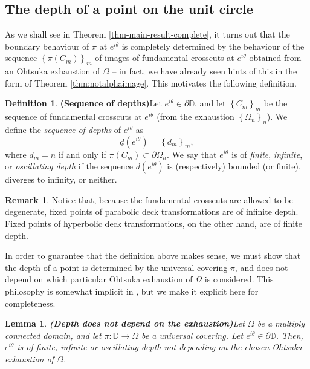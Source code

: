 \documentclass[11pt,a4paper,reqno]{amsart}
\theoremstyle{plain}
\newtheorem{lemma}[thm]{Lemma}
\theoremstyle{definition}
\newtheorem{defi}[thm]{Definition}
\newtheorem{obs}[thm]{Remark}
\theoremstyle{plain}
\begin{document}
\subsection{The depth of a point on the unit circle}\label{ssec:depth} As we shall see in Theorem \ref{thm-main-result-complete},
it turns out that the boundary behaviour of $\pi$ at $e^{i\theta}$ is completely determined by the behaviour of the sequence $\left\lbrace \pi(C_m)\right\rbrace _m$ of images of fundamental crosscuts at $e^{i\theta}$ obtained from an Ohtsuka exhaustion of $\Omega$ -- in fact, we have already seen hints of this in the form of Theorem \ref{thm:notalphaimage}. This motivates the following definition.
\begin{defi}{\bf (Sequence of depths)}\label{def:depthalpha}
	Let $ e^{i\theta}\in\partial\mathbb{D} $, and let $ \left\lbrace C_m\right\rbrace _m $ be the sequence of fundamental crosscuts at $ e^{i\theta} $ (from the exhaustion $ \left\lbrace \Omega_n\right\rbrace _n $). We define the {\em sequence of depths} of $ e^{i\theta} $ as \[\underline{d}(e^{i\theta}) = \left\lbrace d_m\right\rbrace _m,\] where $ d_m=n $ if and only if $ \pi (C_m)\subset \partial\Omega_n $.
	We say that $ e^{i\theta} $ is of {\em finite}, {\em infinite}, or {\em oscillating depth} if the sequence $ \underline{d}(e^{i\theta}) $ is (respectively) bounded (or finite), diverges to infinity, or neither.
\end{defi}
\begin{obs}
	Notice that, because the fundamental crosscuts are allowed to be degenerate, fixed points of parabolic deck transformations are of infinite depth. Fixed points of hyperbolic deck transformations, on the other hand, are of finite depth.
\end{obs}
In order to guarantee that the definition above makes sense, we must show that the depth of a point is determined by the universal covering $\pi$, and does not depend on which particular Ohtsuka exhaustion of $\Omega$ is considered. This philosophy is somewhat implicit in \cite{Oht54}, but we make it explicit here for completeness.
\begin{lemma}{\bf (Depth does not depend on the exhaustion)}\label{lemma-equivalence-ohtsuka}
	Let $ \Omega $ be a multiply connected domain, and let $ \pi\colon \mathbb{D}\to\Omega $ be a universal covering. Let $ e^{i\theta} \in\partial\mathbb{D}$. Then, $ e^{i\theta} $ is of finite, infinite or oscillating depth  not depending on the chosen Ohtsuka exhaustion of $ \Omega $.
\end{lemma}
\end{document}
